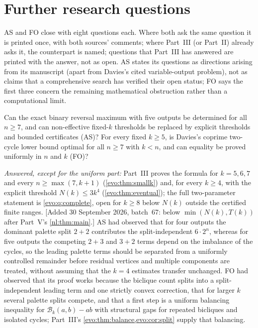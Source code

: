 \documentclass[11pt,a4paper]{article}
\numberwithin{equation}{section}
\theoremstyle{definition}
\theoremstyle{remark}
\newcommand{\Bip}{\mathcal B}
\begin{document}
\section{Further research questions}\label{fo:sec:questions}

AS and FO close with eight questions each. Where both ask the same question it
is printed once, with both sources' comments; where Part~III (or Part~II)
already asks it, the counterpart is named; questions that Part~III has
answered are printed with the answer, not as open. AS states its questions as
directions arising from its manuscript (apart from Davies's cited
variable-output problem), not as claims that a comprehensive search has
verified their open status; FO says the first three concern the remaining
mathematical obstruction rather than a computational limit.

\begin{question}\label{fo:q:next}
Can the exact binary reversal maximum with five outputs be determined for all
$n\ge7$, and can non-effective fixed-$k$ thresholds be replaced by explicit
thresholds and bounded certificates (AS)? For every fixed $k\ge5$, is Davies's
coprime two-cycle lower bound optimal for all $n\ge7$ with $k<n$, and can
equality be proved uniformly in $n$ and $k$ (FO)?
\end{question}
\emph{Answered, except for the uniform part:} Part~III proves the formula for
$k=5,6,7$ and every $n\ge\max(7,k+1)$ (\cref{evo:thm:smallk}) and, for every
$k\ge4$, with the explicit threshold $N(k)\le3k^4$ (\cref{evo:thm:eventual});
the full two-parameter statement is \cref{evo:q:complete}, open for $k\ge8$
below $N(k)$ outside the certified finite ranges. [Added 30 September 2026, batch~67: below $\min(N(k),T(k))$ after Part~V's
\cref{nl:thm:main}.] AS had observed that for four
outputs the dominant palette split $2+2$ contributes the split-independent
$6\cdot2^n$, whereas for five outputs the competing $2+3$ and $3+2$ terms
depend on the imbalance of the cycles, so the leading palette terms should be
separated from a uniformly controlled remainder before residual vertices and
multiple components are treated, without assuming that the $k=4$ estimates
transfer unchanged. FO had observed that its proof works because the
biclique count splits into a split-independent leading term and one strictly
convex correction, that for larger $k$ several palette splits compete, and that
a first step is a uniform balancing inequality for $\Bip_k(a,b)-ab$ with
structural gaps for repeated bicliques and isolated cycles; Part~III's
\cref{evo:thm:balance,evo:cor:split} supply that balancing.
\end{document}
